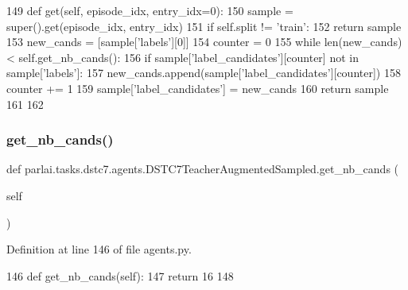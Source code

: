 \begin{DoxyCode}
149     \textcolor{keyword}{def }get(self, episode\_idx, entry\_idx=0):
150         sample = super().get(episode\_idx, entry\_idx)
151         \textcolor{keywordflow}{if} self.split != \textcolor{stringliteral}{'train'}:
152             \textcolor{keywordflow}{return} sample
153         new\_cands = [sample[\textcolor{stringliteral}{'labels'}][0]]
154         counter = 0
155         \textcolor{keywordflow}{while} len(new\_cands) < self.get\_nb\_cands():
156             \textcolor{keywordflow}{if} sample[\textcolor{stringliteral}{'label\_candidates'}][counter] \textcolor{keywordflow}{not} \textcolor{keywordflow}{in} sample[\textcolor{stringliteral}{'labels'}]:
157                 new\_cands.append(sample[\textcolor{stringliteral}{'label\_candidates'}][counter])
158             counter += 1
159         sample[\textcolor{stringliteral}{'label\_candidates'}] = new\_cands
160         \textcolor{keywordflow}{return} sample
161 
162 
\end{DoxyCode}
\mbox{\label{classparlai_1_1tasks_1_1dstc7_1_1agents_1_1DSTC7TeacherAugmentedSampled_a8be3cd7226a4c0c61fe422cb47d26ccc}} 
\subsubsection{\texorpdfstring{get\+\_\+nb\+\_\+cands()}{get\_nb\_cands()}}
{\footnotesize\ttfamily def parlai.\+tasks.\+dstc7.\+agents.\+D\+S\+T\+C7\+Teacher\+Augmented\+Sampled.\+get\+\_\+nb\+\_\+cands (\begin{DoxyParamCaption}\item[{}]{self }\end{DoxyParamCaption})}



Definition at line 146 of file agents.\+py.


\begin{DoxyCode}
146     \textcolor{keyword}{def }get\_nb\_cands(self):
147         \textcolor{keywordflow}{return} 16
148 
\end{DoxyCode}
\mbox{\label{classparlai_1_1tasks_1_1dstc7_1_1agents_1_1DSTC7TeacherAugmentedSampled_ab52133c4ddb36400b28221e359f504e3}} 
